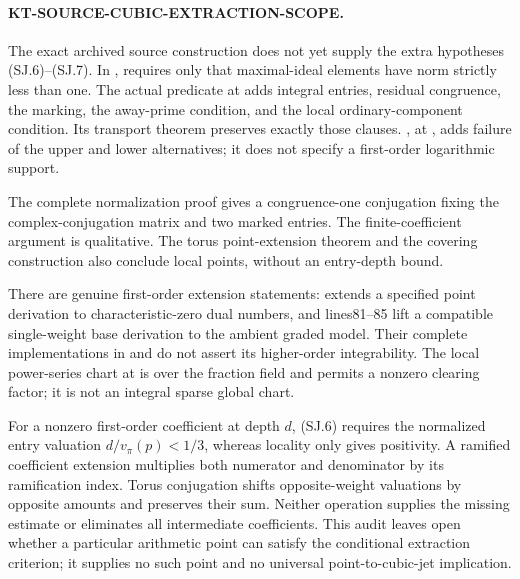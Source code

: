 \paragraph{KT-SOURCE-CUBIC-EXTRACTION-SCOPE.}
The exact archived source construction does not yet supply
the extra hypotheses (SJ.6)--(SJ.7).
In ,  requires
only that maximal-ideal elements have norm strictly less than
one.  The actual  predicate at
 adds integral entries, residual
congruence, the marking, the away-prime condition, and the
local ordinary-component condition.  Its transport theorem
 preserves exactly those clauses.
, at , adds failure
of the upper and lower alternatives; it does not specify a
first-order logarithmic support.

The complete normalization proof
 gives a congruence-one conjugation
fixing the complex-conjugation matrix and two marked entries.
The finite-coefficient argument
 is qualitative.
The torus point-extension theorem
and the covering construction 
also conclude local points, without an entry-depth bound.

There are genuine first-order extension statements:
 extends a specified point
derivation to characteristic-zero dual numbers, and
lines81--85 lift a compatible single-weight base derivation
to the ambient graded model.  Their complete implementations
in 
and 
do not assert its higher-order integrability.
The local power-series chart at 
is over the fraction field and permits a nonzero clearing
factor; it is not an integral sparse global chart.

For a nonzero first-order coefficient at depth $d$, (SJ.6)
requires the normalized entry valuation
$d/v_\pi(p)<1/3$, whereas locality only gives positivity.
A ramified coefficient extension multiplies both numerator
and denominator by its ramification index.  Torus conjugation
shifts opposite-weight valuations by opposite amounts and
preserves their sum.  Neither operation supplies the missing
estimate or eliminates all intermediate coefficients.
This audit leaves open whether a particular arithmetic point
can satisfy the conditional extraction criterion; it supplies
no such point and no universal point-to-cubic-jet implication.
